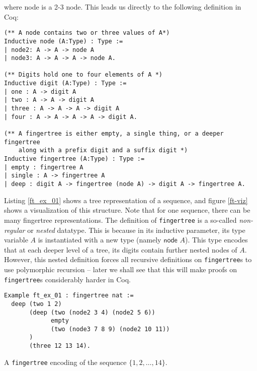 \documentclass{article}
\newcommand{\code}[1]{\texttt{#1}}
\begin{document}
where \textsf{node} is a 2-3 node. This leads us directly to the following definition in Coq:

\begin{listing}[H]
\begin{verbatim}
(** A node contains two or three values of A*)
Inductive node (A:Type) : Type :=
| node2: A -> A -> node A
| node3: A -> A -> A -> node A.

(** Digits hold one to four elements of A *)
Inductive digit (A:Type) : Type :=
| one : A -> digit A
| two : A -> A -> digit A
| three : A -> A -> A -> digit A
| four : A -> A -> A -> A -> digit A.

(** A fingertree is either empty, a single thing, or a deeper fingertree
    along with a prefix digit and a suffix digit *)
Inductive fingertree (A:Type) : Type :=
| empty : fingertree A
| single : A -> fingertree A
| deep : digit A -> fingertree (node A) -> digit A -> fingertree A.
\end{verbatim}
\end{listing}
Listing \ref{ft_ex_01} shows a tree representation of a sequence, and
figure \ref{ft-viz} shows a visualization of this structure. Note that
for one sequence, there can be many fingertree representations. The definition
of \code{fingertree} is a so-called \textit{non-regular} or \textit{nested}
datatype. This is because in its inductive parameter, its type variable $A$
is instantiated with a new type (namely $\textsf{node } A$). This type
encodes that at each deeper level of a tree, its digits contain further nested
nodes of $A$. However, this nested definition forces all recursive definitions
on \code{fingertree}s to use polymorphic recursion -- later we shall see that
this will make proofs on \code{fingertree}s considerably harder in Coq.

\begin{listing}[H]
\begin{verbatim}
Example ft_ex_01 : fingertree nat :=
  deep (two 1 2)
       (deep (two (node2 3 4) (node2 5 6))
             empty
             (two (node3 7 8 9) (node2 10 11))
       )
       (three 12 13 14).
\end{verbatim}
\caption{A \code{fingertree} encoding of the sequence $\{1,2,\dots,14\}$.}
\label{ft_ex_01}
\end{listing}
\end{document}
